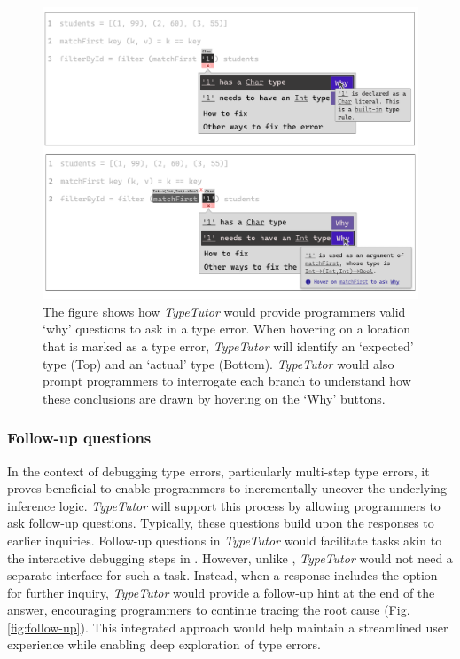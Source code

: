 \begin{figure}[hbt]
  \includegraphics[width=\linewidth]{Why}
  \caption[An example of \textit{TypeTutor} providing explanation (`why' questions)]{
      \label{fig:why}
      The figure shows how \textit{TypeTutor} would provide programmers valid `why' questions to ask in a type error. When hovering on a location that is marked as a type error, \textit{TypeTutor} will identify an `expected' type (Top) and an `actual' type (Bottom). \textit{TypeTutor} would also prompt programmers to interrogate each branch to understand how these conclusions are drawn by hovering on the `Why' buttons. 
    }
\end{figure}



\subsubsection*{Follow-up questions}

In the context of debugging type errors, particularly multi-step type errors, it proves beneficial to enable programmers to incrementally uncover the underlying inference logic. \textit{TypeTutor} will support this process by allowing programmers to ask follow-up questions. Typically, these questions build upon the responses to earlier inquiries. Follow-up questions in \textit{TypeTutor} would facilitate tasks akin to the interactive debugging steps in \chameleon{}. However, unlike \chameleon{}, \textit{TypeTutor} would not need a separate interface for such a task. Instead, when a response includes the option for further inquiry, \textit{TypeTutor} would provide a follow-up hint at the end of the answer, encouraging programmers to continue tracing the root cause (Fig. \ref{fig:follow-up}). This integrated approach would help maintain a streamlined user experience while enabling deep exploration of type errors.


